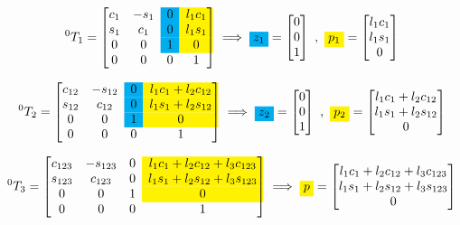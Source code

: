 \begin{equation*}
	{}^0T_1
	=
	\begin{bmatrix}
		c_1 & -s_1 & \cellcolor{cyan}0 & \cellcolor{yellow}l_1 c_1 \\
		s_1 & c_1 & \cellcolor{cyan}0 & \cellcolor{yellow}l_1 s_1 \\
		0 & 0 & \cellcolor{cyan}1 & \cellcolor{yellow}0 \\
		0 & 0 & 0 & 1 \\
	\end{bmatrix}
	\implies
	\colorbox{cyan}{$z_1$}
	=
	\begin{bmatrix}
		0 \\ 0 \\ 1
	\end{bmatrix}
	\ , \
	\colorbox{yellow}{$p_1$}
	=
	\begin{bmatrix}
		l_1 c_1 \\ l_1 s_1 \\ 0
	\end{bmatrix}
\end{equation*}

\begin{equation*}
	{}^0T_2
	=
	\begin{bmatrix}
		c_{12} & -s_{12} & \cellcolor{cyan}0 & \cellcolor{yellow}l_1 c_1 + l_2c_{12}\\
		s_{12} & c_{12} & \cellcolor{cyan}0 & \cellcolor{yellow}l_1 s_1 + l_2s_{12}\\
		0 & 0 & \cellcolor{cyan}1 & \cellcolor{yellow}0 \\
		0 & 0 & 0 & 1 \\
	\end{bmatrix}
	\implies
	\colorbox{cyan}{$z_2$}
	=
	\begin{bmatrix}
		0 \\ 0 \\ 1
	\end{bmatrix}
	\ , \
	\colorbox{yellow}{$p_2$}
	=
	\begin{bmatrix}
		l_1 c_1 + l_2c_{12} \\ l_1 s_1 + l_2s_{12} \\ 0
	\end{bmatrix}
\end{equation*}

\begin{equation*}
	{}^0T_3
	=
	\begin{bmatrix}
		c_{123} & -s_{123} & 0 & \cellcolor{yellow}l_1 c_1 + l_2c_{12} + l_3c_{123}\\
		s_{123} & c_{123} & 0 & \cellcolor{yellow}l_1 s_1 + l_2s_{12} + l_3s_{123}\\
		0 & 0 & 1 & \cellcolor{yellow}0 \\
		0 & 0 & 0 & 1 \\
	\end{bmatrix}
	\implies
	\colorbox{yellow}{$p$}
	=
	\begin{bmatrix}
		l_1 c_1 + l_2c_{12} + l_3c_{123} \\ l_1 s_1 + l_2s_{12} + l_3s_{123} \\ 0
	\end{bmatrix}
\end{equation*}

